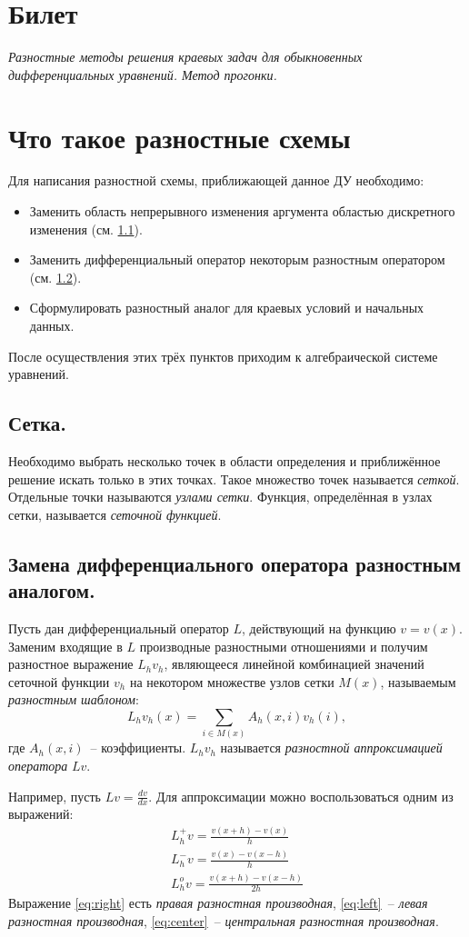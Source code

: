 \documentclass[10pt]{article}
\newcommand{\mys}{\textit}
\begin{document}
\section*{Билет }
{\em Разностные методы решения краевых задач для обыкновенных дифференциальных уравнений. Метод прогонки.}

\section{Что такое разностные схемы}
	Для написания разностной схемы, приближающей данное ДУ необходимо:
	\begin{itemize}
		\item Заменить область непрерывного изменения аргумента областью дискретного изменения (см. \ref{subsection:net}).
		\item Заменить дифференциальный оператор некоторым разностным оператором (см. \ref{subsection:operator}).
		\item Сформулировать разностный аналог для краевых условий и начальных данных.
	\end{itemize}
	После осуществления этих трёх пунктов приходим к алгебраической системе уравнений.

	\subsection{Сетка.}\label{subsection:net}
		Необходимо выбрать несколько точек в области определения и приближённое решение искать только в этих точках. 
		Такое множество точек называется \mys{сеткой}. Отдельные точки называются \mys{узлами сетки}.
		Функция, определённая в узлах сетки, называется \mys{сеточной функцией}.
		
	\subsection{Замена дифференциального оператора разностным аналогом.}\label{subsection:operator}
		Пусть дан дифференциальный оператор $L$, действующий на функцию $v = v(x)$. 
		Заменим входящие в $L$ производные разностными отношениями и получим разностное выражение $L_h v_h$,
		являющееся линейной комбинацией значений сеточной функции $v_h$ на некотором множестве узлов сетки $M(x)$,
		называемым \mys{разностным шаблоном}:
		$$L_h v_h (x) = \sum_{i \in M(x)} A_h(x, i) v_h(i),$$
		где $A_h(x, i)$~-- коэффициенты. $L_h v_h$ называется \mys{разностной аппроксимацией оператора} $L v$. 
	
		Например, пусть $Lv = \frac{dv}{dx}$. Для аппроксимации можно воспользоваться одним из выражений:
		\begin{eqnarray}
			L^{+}_h v = \frac{v(x + h) - v(x)}{h} \label{eq:right}\\
			L^{-}_h v = \frac{v(x) - v(x - h)}{h} \label{eq:left}\\
			L^{o}_h v = \frac{v(x + h) - v(x - h)}{2h} \label{eq:center}
		\end{eqnarray}
		Выражение \ref{eq:right} есть \mys{правая разностная производная}, \ref{eq:left}~-- \mys{левая разностная производная},
		\ref{eq:center}~-- \mys{центральная разностная производная}.
\end{document}
